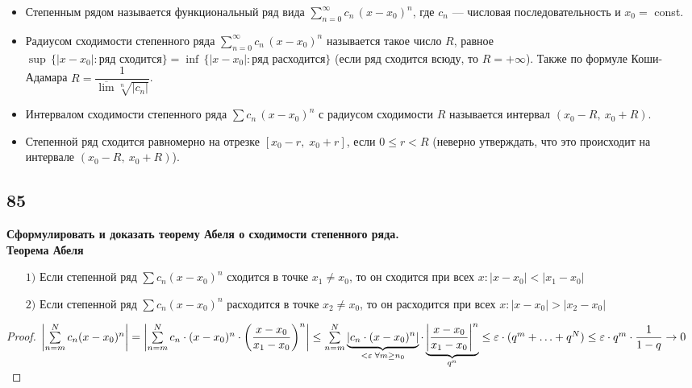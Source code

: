 \documentclass[a4paper, fleqn]{article}
\begin{document}
    \begin{itemize}
        \item Степенным рядом называется функциональный ряд вида $\sum \limits_{n = 0}^{\infty} c_n \, (x - x_0)^n$, 
	где $c_n$ --- числовая последовательность и $x_0 =$ const.

        \item Радиусом сходимости степенного ряда $\sum \limits_{n = 0}^{\infty} c_n \, (x - x_0)^n$ называется такое число $R$, 
	равное \\ ${\sup \, \bigl\{|x - x_0| : \text{ряд сходится}\bigr\}} = {\inf \, \bigl\{|x - x_0| : \text{ряд расходится}\bigr\}}$ 
	(если ряд сходится всюду, то ${R = +\infty}$). Также по формуле Коши-Адамара $R = \dfrac1{\overline{\lim} \sqrt[n]{|c_n|}}$.

        \item Интервалом сходимости степенного ряда $\sum c_n \, (x - x_0)^n$ с радиусом сходимости $R$ называется интервал $(x_0 - R, \: x_0 + R)$.

        \item Степенной ряд сходится равномерно на отрезке $[x_0 - r, \; x_0 + r]$, если $0 \leqslant r < R$ 
	(неверно утверждать, что это происходит на интервале $(x_0 - R, \: x_0 + R)$). 
    \end{itemize}
        
        
    \subsection*{85}
	\textbf{ Сформулировать и доказать теорему Абеля о сходимости степенного ряда.} \\[5 pt]
	\textbf{ Теорема Абеля} \\[-15 pt] 
	\begin{enumerate}
	\item[$1)$] Если степенной ряд $\sum c_n (x - x_0)^n$ сходится в точке $x_1 \ne x_0$, 
	то он сходится при всех $x : |x - x_0| < |x_1 - x_0|$
	\item[$2)$] Если степенной ряд $\sum c_n (x - x_0)^n$ расходится в точке $x_2 \ne x_0$, 
	то он расходится при всех $x : |x - x_0| > |x_2 - x_0|$\\[-30 pt]
	\end{enumerate}
	\begin{proof}
	$\left| \sum\limits_{n = m}^N c_n (x - x_0)^n \right| = 
	\left| \sum\limits_{n = m}^N c_n \cdot (x - x_0)^n \cdot \left( \dfrac{x - x_0}{x_1 - x_0} \right)^n \right| \le  \\[3 pt]
	\sum\limits_{n = m}^N \underbrace{\left| c_n \cdot (x - x_0)^n \right|}_{< \varepsilon \; \forall m \ge n_0} \cdot 
	\underbrace{\left| \dfrac{x - x_0}{x_1 - x_0} \right|^n}_{q^n}  \le
	\varepsilon \cdot (q^m + \ldots + q^N) \le \varepsilon \cdot q^m \cdot \dfrac1{1 - q} \to 0$
	\end{proof}    
    
\end{document}
